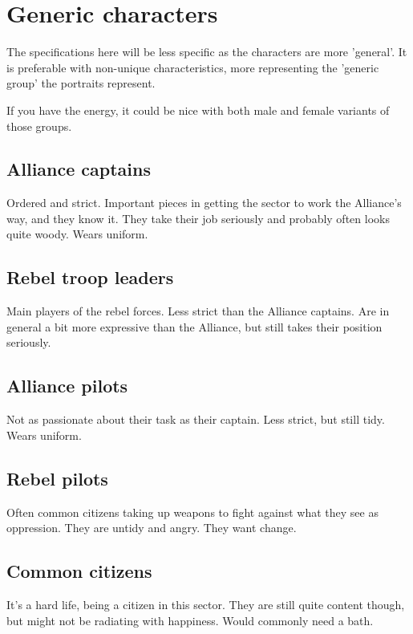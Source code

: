 \documentclass[a4paper,12pt]{article}
\begin{document}
\section{Generic characters}

The specifications here will be less specific as the characters are more 'general'. It is preferable
with non-unique characteristics, more representing the 'generic group' the portraits represent.

If you have the energy, it could be nice with both male and female variants of those groups.

\subsection{Alliance captains}

Ordered and strict. Important pieces in getting the sector to work the Alliance's way, and they know it.
They take their job seriously and probably often looks quite woody. Wears uniform.

\subsection{Rebel troop leaders}

Main players of the rebel forces. Less strict than the Alliance captains. 
Are in general a bit more expressive than the Alliance, but still takes their position seriously.

\subsection{Alliance pilots}

Not as passionate about their task as their captain. Less strict, but still tidy. Wears uniform.

\subsection{Rebel pilots}

Often common citizens taking up weapons to fight against what they see as oppression.
They are untidy and angry. They want change.

\subsection{Common citizens}

It's a hard life, being a citizen in this sector. They are still quite content though, but might not
be radiating with happiness. Would commonly need a bath.
\end{document}
